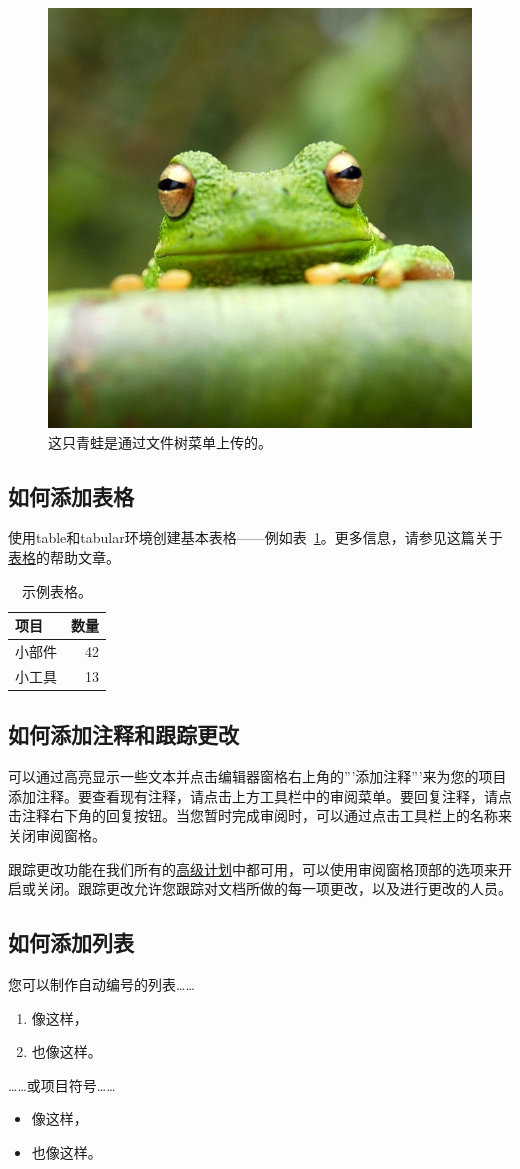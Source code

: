 \documentclass{article}
\begin{document}
\begin{figure}[H]
\centering
\includegraphics[width=0.25\linewidth]{frog.jpg}
\caption{\label{fig:frog}这只青蛙是通过文件树菜单上传的。}
\end{figure}

\subsection{如何添加表格}

使用table和tabular环境创建基本表格——例如表~\ref{tab:widgets}。更多信息，请参见这篇关于\href{https://www.overleaf.com/learn/latex/tables}{表格}的帮助文章。

\begin{table}[H]
\centering
\begin{tabular}{l|r}
项目 & 数量 \\\hline
小部件 & 42 \\
小工具 & 13
\end{tabular}
\caption{\label{tab:widgets}示例表格。}
\end{table}

\subsection{如何添加注释和跟踪更改}

可以通过高亮显示一些文本并点击编辑器窗格右上角的'''添加注释'''来为您的项目添加注释。要查看现有注释，请点击上方工具栏中的审阅菜单。要回复注释，请点击注释右下角的回复按钮。当您暂时完成审阅时，可以通过点击工具栏上的名称来关闭审阅窗格。

跟踪更改功能在我们所有的\href{https://www.overleaf.com/user/subscription/plans}{高级计划}中都可用，可以使用审阅窗格顶部的选项来开启或关闭。跟踪更改允许您跟踪对文档所做的每一项更改，以及进行更改的人员。

\subsection{如何添加列表}

您可以制作自动编号的列表……

\begin{enumerate}
\item 像这样，
\item 也像这样。
\end{enumerate}
……或项目符号……
\begin{itemize}
\item 像这样，
\item 也像这样。
\end{itemize}
\end{document}
